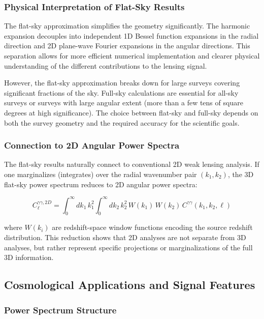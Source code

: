 \subsubsection{Physical Interpretation of Flat-Sky Results}

The flat-sky approximation simplifies the geometry significantly. The harmonic expansion decouples into independent 1D Bessel function expansions in the radial direction and 2D plane-wave Fourier expansions in the angular directions. This separation allows for more efficient numerical implementation and clearer physical understanding of the different contributions to the lensing signal.

However, the flat-sky approximation breaks down for large surveys covering significant fractions of the sky. Full-sky calculations are essential for all-sky surveys or surveys with large angular extent (more than a few tens of square degrees at high significance). The choice between flat-sky and full-sky depends on both the survey geometry and the required accuracy for the scientific goals.

\subsubsection{Connection to 2D Angular Power Spectra}

The flat-sky results naturally connect to conventional 2D weak lensing analysis. If one marginalizes (integrates) over the radial wavenumber pair $(k_1, k_2)$, the 3D flat-sky power spectrum reduces to 2D angular power spectra:

\begin{equation}
C_\ell^{\gamma\gamma, 2D} = \int_0^\infty dk_1 \, k_1^2 \int_0^\infty dk_2 \, k_2^2 \, W(k_1) \, W(k_2) \, C^{\gamma\gamma}(k_1, k_2, \ell)
\label{eq:2d_from_3d}
\end{equation}

where $W(k_i)$ are redshift-space window functions encoding the source redshift distribution. This reduction shows that 2D analyses are not separate from 3D analyses, but rather represent specific projections or marginalizations of the full 3D information.

\subsection{Cosmological Applications and Signal Features}

\subsubsection{Power Spectrum Structure}

